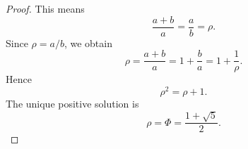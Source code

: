 \documentclass[10pt,a4paper]{amsart}
\begin{document}
\begin{proof}
	This means
	\begin{equation}
		\frac{a+b}{a}=\frac{a}{b}=\rho.
	\end{equation}
	Since $\rho=a/b$, we obtain
	\begin{equation}
		\rho = \frac{a+b}{a} = 1+\frac{b}{a} = 1+\frac{1}{\rho}.
	\end{equation}
	Hence
	\begin{equation}
		\rho^2=\rho+1.
	\end{equation}
	The unique positive solution is
	\begin{equation}
		\rho=\Phi=\frac{1+\sqrt5}{2}.
	\end{equation}
\end{proof}
\end{document}
